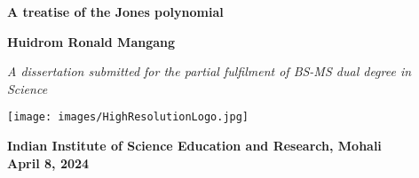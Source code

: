 \date{}

\thispagestyle{empty}

\begin{titlepage}

\begin{center}
    \LARGE
    \textbf{A treatise of the Jones polynomial}

    \vspace{1cm}
    \Large
    \textbf{Huidrom Ronald Mangang}
    \vspace{1cm}
    
    \large
    \textit{A dissertation submitted for the partial fulfilment of
    BS-MS dual degree in Science}
    
    \vspace{3.5cm}

    \texttt{[image: images/HighResolutionLogo.jpg]}

    \large
    \textbf{Indian Institute of Science Education and Research, Mohali}\\
    \large
    \textbf{April 8, 2024}
\end{center}

\end{titlepage}

\thispagestyle{empty}
\cleardoublepage
